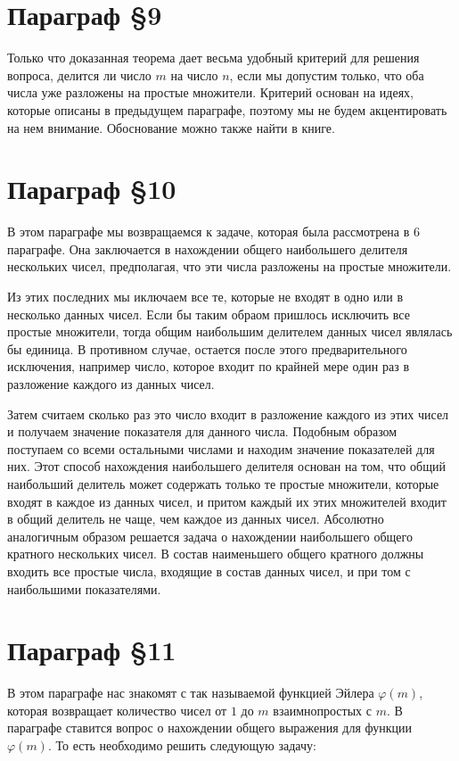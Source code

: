 \section{Параграф \S 9}

Только что доказанная теорема дает весьма удобный критерий для решения вопроса, делится ли число $m$ на число $n$, если мы допустим только, что оба числа уже разложены на простые множители. Критерий основан на идеях, которые описаны в предыдущем параграфе, поэтому мы не будем акцентировать на нем внимание. Обоснование можно также найти в книге.

\section{Параграф \S 10}

В этом параграфе мы возвращаемся к задаче, которая была рассмотрена в 6 параграфе. Она заключается в нахождении общего наибольшего делителя нескольких чисел, предполагая, что эти числа разложены на простые множители. 

Из этих последних мы иключаем все те, которые не входят в одно или в несколько данных чисел. Если бы таким обраом пришлось исключить все простые множители, тогда общим наибольшим делителем данных чисел являлась бы единица. В противном случае, остается после этого предварительного исключения, например число, которое входит по крайней мере один раз в разложение каждого из данных чисел. 

Затем считаем сколько раз это число входит в разложение каждого из этих чисел и получаем значение показателя для данного числа. Подобным образом поступаем со всеми остальными числами и находим значение показателей для них. Этот способ нахождения наибольшего делителя основан на том, что общий наибольший делитель может содержать только те простые множители, которые входят в каждое из данных чисел, и притом каждый их этих множителей входит в общий делитель не чаще, чем каждое из данных чисел. Абсолютно аналогичным образом решается задача о нахождении наибольшего общего кратного нескольких чисел. В состав наименьшего общего кратного должны входить все простые числа, входящие в состав данных чисел, и при том с наибольшими показателями.

\section{Параграф \S 11}

В этом параграфе нас знакомят с так называемой функцией Эйлера $\varphi(m)$, которая возвращает количество чисел от $1$ до $m$ взаимнопростых с $m$. В параграфе ставится вопрос о нахождении общего выражения для функции $\varphi(m)$. То есть необходимо решить следующую задачу:


